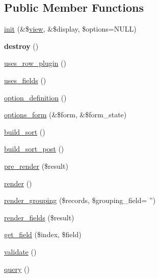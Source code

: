 \subsection*{Public Member Functions}
\begin{CompactItemize}
\item 
\hyperlink{classviews__plugin__style_b48326b2ea3d9bd9ad5fdf4f544c8eed}{init} (\&\$\hyperlink{classview}{view}, \&\$display, \$options=NULL)
\item 
\hypertarget{classviews__plugin__style_0197e61c10e03cfc78f823db2ce8b620}{
\textbf{destroy} ()}
\label{classviews__plugin__style_0197e61c10e03cfc78f823db2ce8b620}

\item 
\hyperlink{classviews__plugin__style_92ca48fa0359e70572f9a226ac54697f}{uses\_\-row\_\-plugin} ()
\item 
\hyperlink{classviews__plugin__style_04c6419f4049b7e2644904b5089f2e41}{uses\_\-fields} ()
\item 
\hyperlink{classviews__plugin__style_95b6f2eadf403ff36f1ff2860294b3c2}{option\_\-definition} ()
\item 
\hyperlink{classviews__plugin__style_fe3d437ff4398315b15c4e60975dbb1c}{options\_\-form} (\&\$form, \&\$form\_\-state)
\item 
\hyperlink{classviews__plugin__style_13b4b43f813fde038a199d2ec26fc76e}{build\_\-sort} ()
\item 
\hyperlink{classviews__plugin__style_f59de962f895ccd0b3adf960b908e0bd}{build\_\-sort\_\-post} ()
\item 
\hyperlink{classviews__plugin__style_9d35c181b927a52d8bf34ac629b05d20}{pre\_\-render} (\$result)
\item 
\hyperlink{classviews__plugin__style_a52b618e91b11a7d10ad1feadbc891f1}{render} ()
\item 
\hyperlink{classviews__plugin__style_76a269c0c69d94662fcbdb0ec4e4f09f}{render\_\-grouping} (\$records, \$grouping\_\-field= '')
\item 
\hyperlink{classviews__plugin__style_95d504017017c611b482a920119452db}{render\_\-fields} (\$result)
\item 
\hyperlink{classviews__plugin__style_dd1dccbb850840911c335ae09ff266d7}{get\_\-field} (\$index, \$field)
\item 
\hyperlink{classviews__plugin__style_41929fec27cb0ae7a801276969a080a1}{validate} ()
\item 
\hyperlink{classviews__plugin__style_f6b601d8f42cc3d86721fcad76eaae4b}{query} ()
\end{CompactItemize}


